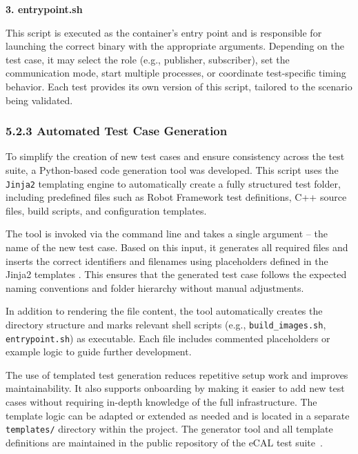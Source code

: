 \vspace{1em}
\textbf{3. entrypoint.sh}

\vspace{0.3em}
This script is executed as the container's entry point and is responsible for launching the correct binary with the appropriate arguments. Depending on the test case, it may select the role (e.g., publisher, subscriber), set the communication mode, start multiple processes, or coordinate test-specific timing behavior. Each test provides its own version of this script, tailored to the scenario being validated.


\subsubsection*{5.2.3 Automated Test Case Generation}

To simplify the creation of new test cases and ensure consistency across the test suite, a Python-based code generation tool was developed. This script uses the \texttt{Jinja2} templating engine to automatically create a fully structured test folder, including predefined files such as Robot Framework test definitions, C++ source files, build scripts, and configuration templates.

\vspace{1em}
The tool is invoked via the command line and takes a single argument – the name of the new test case. Based on this input, it generates all required files and inserts the correct identifiers and filenames using placeholders defined in the Jinja2 templates \cite{jinja2_docs}. This ensures that the generated test case follows the expected naming conventions and folder hierarchy without manual adjustments.

\vspace{1em}
In addition to rendering the file content, the tool automatically creates the directory structure and marks relevant shell scripts (e.g., \texttt{build\_images.sh}, \texttt{entrypoint.sh}) as executable. Each file includes commented placeholders or example logic to guide further development.

\vspace{1em}
The use of templated test generation reduces repetitive setup work and improves maintainability. It also supports onboarding by making it easier to add new test cases without requiring in-depth knowledge of the full infrastructure. The template logic can be adapted or extended as needed and is located in a separate \texttt{templates/} directory within the project. The generator tool and all template definitions are maintained in the public repository of the eCAL test suite~\cite{ecal_test_generator, ecal_test_suite_repo}.


